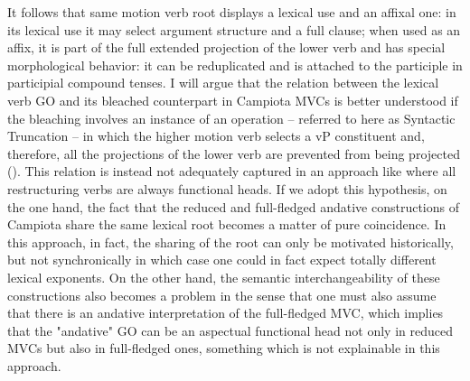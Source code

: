 \documentclass[output=paper]{langscibook}
\begin{document}
It follows that same motion verb root displays a lexical use and an affixal one:  in its lexical use it may select argument structure and a full clause; when used as an affix, it is part of the full extended projection of the lower verb and has special morphological behavior: it can be reduplicated and is attached to the participle in participial compound tenses.  I will argue that the relation between the lexical verb GO and its bleached counterpart in Campiota MVCs is better understood if the bleaching involves an instance of an operation -- referred to here as Syntactic Truncation -- in which the higher motion verb selects a vP constituent and, therefore, all the projections of the lower verb are prevented from being projected (\cite{wurmbrand2014a, wurmbrand2015, wurmbrand2017verb}). This relation is instead not adequately captured in an approach like \cite{cinque2001a, cinque2006a} where all restructuring verbs are always functional heads. If we adopt this hypothesis, on the one hand, the fact that the reduced and full-fledged andative constructions of  Campiota share the same lexical root becomes a matter of pure coincidence. In this approach, in fact, the sharing of the root can only be motivated historically, but not synchronically in which case one could in fact expect totally different lexical exponents. On the other hand, the semantic interchangeability of these constructions also becomes a problem in the sense that one must also assume that there is an andative interpretation of the full-fledged MVC, which implies that the "andative" GO can be an aspectual functional head not only in reduced MVCs but also in full-fledged ones, something which is not explainable in this approach.
\end{document}
